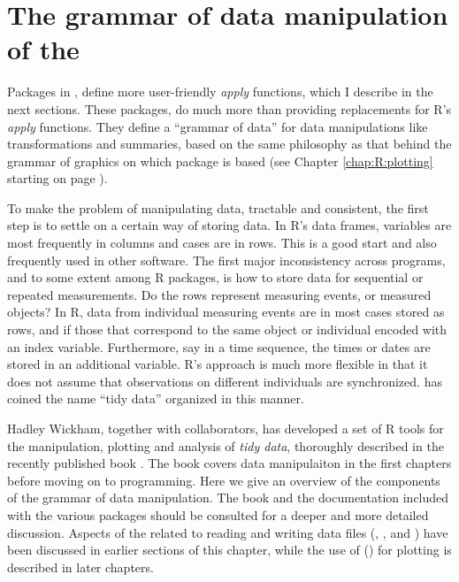 \documentclass[krantz2,ChapterTOCs]{krantz}\usepackage{knitr}
\begin{document}
\section[Grammar of data manipulation]{The grammar of data manipulation of the }

Packages in , define more user-friendly \emph{apply} functions, which I describe in the next sections. These packages, do much more than providing replacements for R's \emph{apply} functions. They define a ``grammar of data'' for data manipulations like transformations and summaries, based on the same philosophy as that behind the grammar of graphics on which package  is based (see Chapter \ref{chap:R:plotting} starting on page \pageref{chap:R:plotting}).

To make the problem of manipulating data, tractable and consistent, the first step is to settle on a certain way of storing data. In R's data frames, variables are most frequently in columns and cases are in rows. This is a good start and also frequently used in other software. The first major inconsistency across programs, and to some extent among R packages, is how to store data for sequential or repeated measurements. Do the rows represent measuring events, or measured objects? In R, data from individual measuring events are in most cases stored as rows, and if those that correspond to the same object or individual encoded with an index variable. Furthermore, say in a time sequence, the times or dates are stored in an additional variable. R's approach is much more flexible in that it does not assume that observations on different individuals are synchronized. \citeauthor{Wickham2014a} \cite{Wickham2014a} has coined the name ``tidy data'' organized in this manner.

Hadley Wickham, together with collaborators, has developed a set of R tools for the manipulation, plotting and analysis of \emph{tidy data}, thoroughly described in the recently published book  \autocite{Wickham2017}. The book  \autocite{Peng2017} covers data manipulaiton in the first chapters before moving on to programming. Here we give an overview of the components of the  grammar of data manipulation. The book  and the documentation included with the various packages should be consulted for a deeper and more detailed discussion. Aspects of the  related to reading and writing data files (, , and ) have been discussed in earlier sections of this chapter, while the use of () for plotting is described in later chapters.
\end{document}
